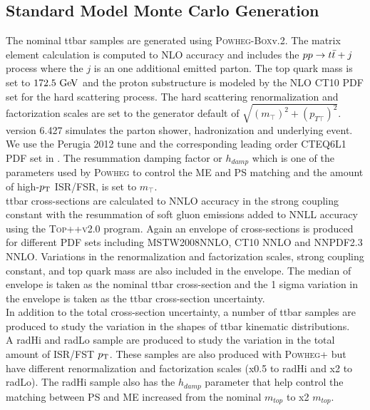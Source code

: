 \subsection{Standard Model \ttbar Monte Carlo Generation}

\indent The nominal ttbar samples are generated using \textsc{Powheg-Box}v.2.  The matrix element calculation is computed to NLO accuracy and includes the $pp \rightarrow t\bar{t} + j$ process where the $j$ is an one additional emitted parton.  The top quark mass is set to $172.5 \gev$ and the proton substructure is modeled by the NLO CT10 PDF set \cite{CT10} for the hard scattering process.  The hard scattering renormalization and factorization scales are set to the generator default of $\sqrt{(m_{\top})^2 + (p_{T \top})^2}$.  \\

\indent {} version 6.427 simulates the parton shower, hadronization and underlying event.  We use the Perugia 2012 tune \cite{Perugia2012} and the corresponding leading order CTEQ6L1 PDF set \cite{CTEQ6L1} in .  The resummation damping factor or $h_{damp}$ which is one of the parameters used by \textsc{Powheg} to control the ME and PS matching and the amount of high-$p_{\mathrm{T}}$ ISR/FSR, is set to $m_{\top}$. \\

\indent ttbar cross-sections are calculated to NNLO accuracy in the strong coupling constant with the resummation of soft gluon emissions added to NNLL accuracy using the \textsc{Top++v2.0} program. \cite{topXsec}  Again an envelope of cross-sections is produced for different PDF sets including MSTW2008NNLO, CT10 NNLO and NNPDF2.3 NNLO.  Variations in the renormalization and factorization scales, strong coupling constant, and top quark mass are also included in the envelope.  The median of envelope is taken as the nominal ttbar cross-section and the 1 sigma variation in the envelope is taken as the ttbar cross-section uncertainty.  \\

\indent In addition to the total cross-section uncertainty, a number of ttbar samples are produced to study the variation in the shapes of ttbar kinematic distributions. \\
\indent  A radHi and radLo sample are produced to study the variation in the total amount of ISR/FST $p_{\mathrm{T}}$.  These samples are also produced with \textsc{Powheg+} but have different renormalization and factorization scales (x0.5 to radHi and x2 to radLo). The radHi sample also has the $h_{damp}$ parameter that help control the matching between PS and ME increased from the nominal $m_{top}$ to x2 $m_{top}$. \\

